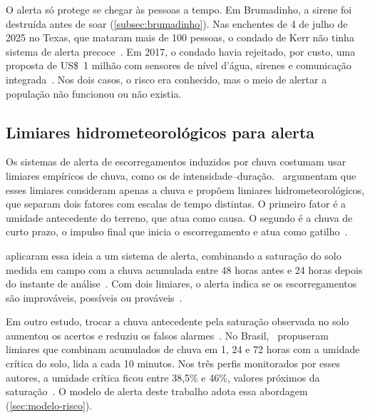 O alerta só protege se chegar às pessoas a tempo. Em Brumadinho, a
sirene foi destruída antes de soar (\autoref{subsec:brumadinho}). Nas
enchentes de 4 de julho de 2025 no Texas, que mataram mais de 100
pessoas, o condado de Kerr não tinha sistema de alerta precoce~\cite{bbc2025texas, metsul2025texas}.
Em 2017, o condado havia rejeitado, por custo, uma proposta de US\$~1
milhão com sensores de nível d'água, sirenes e comunicação integrada~\cite{metsul2025texas}. Nos dois casos, o risco era conhecido, mas o
meio de alertar a população não funcionou ou não existia.

\subsection{Limiares hidrometeorológicos para alerta}
\label{subsec:rev_limiares_hidromet}

Os sistemas de alerta de escorregamentos induzidos por chuva costumam
usar limiares empíricos de chuva, como os de intensidade--duração.~ argumentam que esses limiares
consideram apenas a chuva e propõem limiares hidrometeorológicos, que
separam dois fatores com escalas de tempo distintas.
O primeiro fator é a umidade antecedente do terreno, que atua como
causa. O segundo é a chuva de curto prazo, o impulso final que inicia o
escorregamento e atua como gatilho~\cite{bogaard2018hydrological}.

 aplicaram essa ideia a um sistema de
alerta, combinando a saturação do solo medida em campo com a chuva
acumulada entre 48 horas antes e 24 horas depois do instante de análise~\cite[p.~5]{mirus2018developing}. Com dois limiares, o alerta indica se
os escorregamentos são improváveis, possíveis ou prováveis~\cite[p.~14]{mirus2018developing}.

Em outro estudo, trocar a chuva antecedente pela saturação observada no
solo aumentou os acertos e reduziu os falsos alarmes~\cite{mirus2018integrating}. No Brasil,~
propuseram limiares que combinam acumulados de chuva em 1, 24 e 72 horas
com a umidade crítica do solo, lida a cada 10 minutos.
Nos três perfis monitorados por esses autores, a umidade crítica ficou
entre 38,5\% e 46\%, valores próximos da saturação~\cite[p.~74]{mendes2020proposicao}. O modelo de alerta deste trabalho
adota essa abordagem (\autoref{sec:modelo-risco}).

